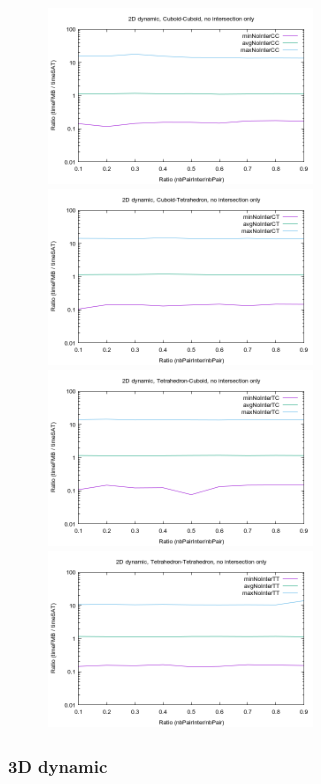 \documentclass[12pt, a4paper]{article}
\begin{document}
\begin{center}
\begin{figure}[H]
\centering\includegraphics[width=7cm]{../Results/qualification2DTimeCCnointer.png}
\centering\includegraphics[width=7cm]{../Results/qualification2DTimeCTnointer.png}
\centering\includegraphics[width=7cm]{../Results/qualification2DTimeTCnointer.png}
\centering\includegraphics[width=7cm]{../Results/qualification2DTimeTTnointer.png}
\end{figure}
\end{center}

\subsubsection{3D dynamic}
\end{document}
